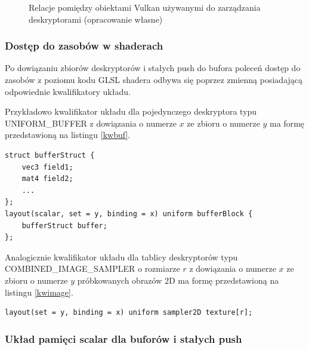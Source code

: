 \begin{figure}[H]
	\caption{Relacje pomiędzy obiektami Vulkan używanymi do zarządzania deskryptorami (opracowanie własne)}
	\label{descriptor_relations}
\end{figure}


\subsubsection{Dostęp do zasobów w shaderach}

Po dowiązaniu zbiorów deskryptorów i stałych push do bufora poleceń dostęp do zasobów z poziomu kodu GLSL shadera odbywa się poprzez zmienną posiadającą odpowiednie kwalifikatory układu.

Przykładowo kwalifikator układu dla pojedynczego deskryptora typu UNIFORM\_BUFFER z dowiązania o numerze $x$ ze zbioru o numerze $y$ ma formę przedstawioną na listingu \ref{kwbuf}.
\lstset{language=GLSL}
\begin{lstlisting}[caption={Kwalifikator układu dla bufora uniform},captionpos=b,label={kwbuf}]
struct bufferStruct {
	vec3 field1;
	mat4 field2;
	...
};
layout(scalar, set = y, binding = x) uniform bufferBlock {
	bufferStruct buffer;
};
\end{lstlisting}

Analogicznie kwalifikator układu dla tablicy deskryptorów typu COMBINED\_IMAGE\_SAMPLER o rozmiarze $r$ z dowiązania o numerze $x$ ze zbioru o numerze $y$ próbkowanych obrazów 2D ma formę przedstawioną na listingu \ref{kwimage}.
\lstset{language=GLSL}
\begin{lstlisting}[caption={Kwalifikator układu dla tablicy tekstur},captionpos=b,label={kwimage}]
layout(set = y, binding = x) uniform sampler2D texture[r];
\end{lstlisting}


\subsubsection{Układ pamięci scalar dla buforów i stałych push}

